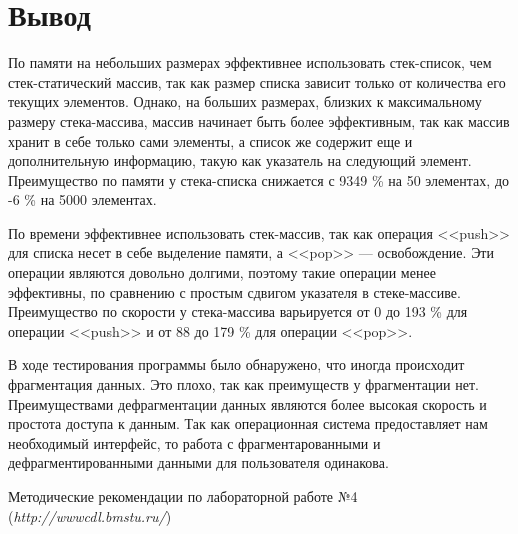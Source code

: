 \documentclass[a4paper,12pt]{extarticle}
\begin{document}
\newpage

\section{Вывод}
По памяти на небольших размерах эффективнее использовать стек-список, чем стек-статический массив, так как размер списка зависит только от количества его текущих элементов. Однако, на больших размерах, близких к максимальному размеру стека-массива, массив начинает быть более эффективным, так как массив хранит в себе только сами элементы, а список же содержит еще и дополнительную информацию, такую как указатель на следующий элемент. Преимущество по памяти у стека-списка снижается с 9349 \% на 50 элементах, до -6 \% на 5000 элементах.

По времени эффективнее использовать стек-массив, так как операция <<push>> для списка несет в себе выделение памяти, а <<pop>> --- освобождение. Эти операции являются довольно долгими, поэтому такие операции менее эффективны, по сравнению с простым сдвигом указателя в стеке-массиве. Преимущество по скорости у стека-массива варьируется от 0 до 193 \% для операции <<push>> и от 88 до 179 \% для операции <<pop>>.

В ходе тестирования программы было обнаружено, что иногда происходит фрагментация данных. Это плохо, так как преимуществ у фрагментации нет. Преимуществами дефрагментации данных являются более высокая скорость и простота доступа к данным. Так как операционная система предоставляет нам необходимый интерфейс, то работа с фрагментарованными и дефрагментированными данными для пользователя одинакова.


\newpage
\begin{thebibliography}{2}
Методические рекомендации по лабораторной работе №4 (\emph{http://wwwcdl.bmstu.ru/}) 
\end{thebibliography}
\end{document}
